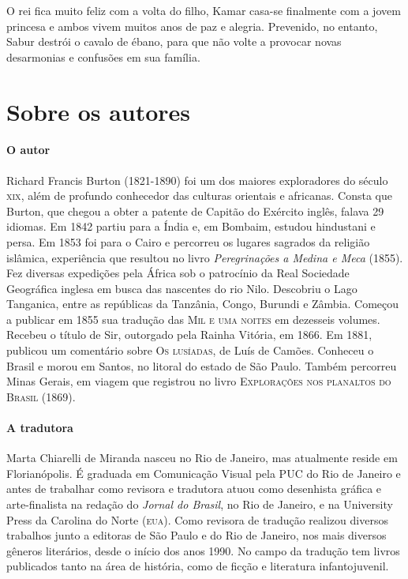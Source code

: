 \documentclass[11pt]{extarticle}
\begin{document}
O rei fica muito feliz com a volta do filho, Kamar casa-se finalmente com a jovem princesa e ambos vivem muitos anos de paz e alegria. Prevenido, no entanto, Sabur destrói o cavalo de ébano, para que não volte a provocar novas desarmonias e confusões em sua família.

\reversemarginpar
\marginparwidth=5cm



\section{Sobre os autores}

\paragraph{O autor} Richard Francis Burton (1821-1890) foi um dos maiores
exploradores do século \textsc{xix}, além de profundo conhecedor das culturas orientais e africanas. Consta que Burton, que chegou a obter a patente de Capitão do Exército inglês, falava 29 idiomas. Em 1842 partiu para a Índia e, em Bombaim, estudou hindustani e persa. Em 1853 foi para o Cairo e percorreu os lugares sagrados da religião islâmica, experiência
que resultou no livro \textit{Peregrinações a Medina e Meca} (1855).
Fez diversas expedições pela África sob o patrocínio da Real Sociedade Geográfica inglesa em busca das nascentes do rio Nilo. Descobriu o Lago Tanganica, entre as repúblicas da
Tanzânia, Congo, Burundi e Zâmbia. Começou a publicar em 1855 sua tradução das \textsc{Mil e uma noites} em dezesseis volumes. Recebeu o título de Sir, outorgado pela Rainha Vitória,
em 1866. Em 1881, publicou um comentário sobre \textsc{Os lusíadas}, de Luís de Camões. Conheceu o Brasil e morou em Santos, no litoral do estado de São Paulo. Também percorreu
Minas Gerais, em viagem que registrou no livro \textsc{Explorações nos planaltos do Brasil} (1869).

\paragraph{A tradutora} Marta Chiarelli de Miranda nasceu no Rio de Janeiro, mas
atualmente reside em Florianópolis. É graduada em Comunicação Visual pela \textsc{PUC} do Rio de Janeiro e antes de trabalhar como revisora e tradutora atuou como desenhista gráfica e arte-finalista na redação do \textit{Jornal do Brasil}, no Rio de Janeiro, e na University Press da Carolina do Norte (\textsc{eua}). Como revisora de tradução realizou diversos trabalhos junto a editoras de São Paulo e do Rio de Janeiro, nos mais diversos gêneros literários, desde o início dos anos 1990. No campo da tradução tem livros publicados tanto na área de história, como de ficção e literatura infantojuvenil.
\end{document}
